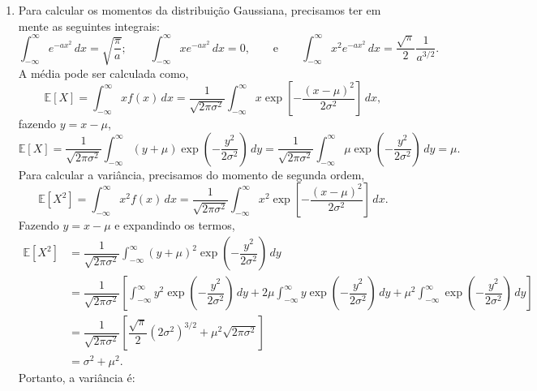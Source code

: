 \begin{enumerate}[label=\textbf{3.\arabic*.}]
	
	\item Para calcular os momentos da distribuição Gaussiana, precisamos ter em mente as seguintes integrais:
	\begin{equation*}
	\int_{-\infty}^{\infty} e^{-ax^2}\, dx = \sqrt{\dfrac{\pi}{a}}; \qquad \int_{-\infty}^{\infty}x e^{-ax^2}\, dx = 0, \qquad \text{e} \qquad \int_{-\infty}^{\infty}x^2 e^{-ax^2}\, dx = \dfrac{\sqrt{\pi}}{2}\dfrac{1}{a^{3/2}}.
	\end{equation*}
	A média pode ser calculada como,
	\begin{equation*}
		\mathbb{E}[X] = \int_{-\infty}^{\infty} x f(x)\, dx = \dfrac{1}{\sqrt{2\pi \sigma^2}} \int_{-\infty}^{\infty} x \exp\left[-\dfrac{(x-\mu)^2}{2\sigma^2}\right]\, dx,
	\end{equation*}
	fazendo $y = x - \mu$,
	\begin{equation*}
		\mathbb{E}[X] = \dfrac{1}{\sqrt{2\pi \sigma^2}} \int_{-\infty}^{\infty} (y + \mu) \exp\left(-\dfrac{y^2}{2\sigma^2}\right)\, dy =  \dfrac{1}{\sqrt{2\pi \sigma^2}} \int_{-\infty}^{\infty} \mu \exp\left(-\dfrac{y^2}{2\sigma^2}\right)\, dy = \mu.
	\end{equation*}
	Para calcular a variância, precisamos do momento de segunda ordem,
	\begin{equation*}
		\mathbb{E}[X^2] = \int_{-\infty}^{\infty} x^2 f(x)\, dx = \dfrac{1}{\sqrt{2\pi \sigma^2}} \int_{-\infty}^{\infty} x^2 \exp\left[-\dfrac{(x-\mu)^2}{2\sigma^2}\right]\, dx.
	\end{equation*}
	Fazendo $y = x - \mu$ e expandindo os termos,
	\begin{align*}
		\mathbb{E}[X^2] &= \dfrac{1}{\sqrt{2\pi \sigma^2}} \int_{-\infty}^{\infty} (y + \mu)^2 \exp\left(-\dfrac{y^2}{2\sigma^2}\right)\, dy \\
		&= \dfrac{1}{\sqrt{2\pi \sigma^2}} \left[\int_{-\infty}^{\infty} y^2 \exp\left(-\dfrac{y^2}{2\sigma^2}\right)\, dy + 2\mu\int_{-\infty}^{\infty}  y \exp\left(-\dfrac{y^2}{2\sigma^2}\right)\, dy + \mu^2\int_{-\infty}^{\infty}  \exp\left(-\dfrac{y^2}{2\sigma^2}\right)\, dy\right] \\
		&= \dfrac{1}{\sqrt{2\pi \sigma^2}} \left[\dfrac{\sqrt{\pi}}{2}\left(2\sigma^2\right)^{3/2} + \mu^2 \sqrt{2\pi\sigma^2} \right] \\ 
		&= \sigma^2 + \mu^2.
	\end{align*}
	Portanto, a variância é:
	\begin{equation*}

\end{equation*}
\end{enumerate}
